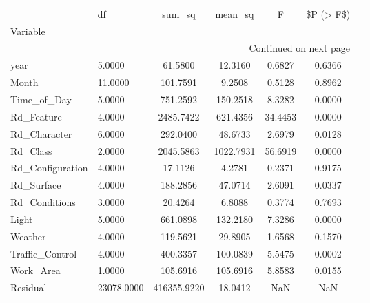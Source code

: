 \begin{longtable}{p{6cm}lccccc}
\toprule
{} &         df &      sum\_sq &   mean\_sq &       F &  \$P (> F\$) \\
Variable         &            &             &           &         &            \\
\midrule
\endhead
\midrule
\multicolumn{6}{r}{{Continued on next page}} \\
\midrule
\endfoot

\bottomrule
\endlastfoot
year             &     5.0000 &     61.5800 &   12.3160 &  0.6827 &     0.6366 \\
Month            &    11.0000 &    101.7591 &    9.2508 &  0.5128 &     0.8962 \\
Time\_of\_Day      &     5.0000 &    751.2592 &  150.2518 &  8.3282 &     0.0000 \\
Rd\_Feature       &     4.0000 &   2485.7422 &  621.4356 & 34.4453 &     0.0000 \\
Rd\_Character     &     6.0000 &    292.0400 &   48.6733 &  2.6979 &     0.0128 \\
Rd\_Class         &     2.0000 &   2045.5863 & 1022.7931 & 56.6919 &     0.0000 \\
Rd\_Configuration &     4.0000 &     17.1126 &    4.2781 &  0.2371 &     0.9175 \\
Rd\_Surface       &     4.0000 &    188.2856 &   47.0714 &  2.6091 &     0.0337 \\
Rd\_Conditions    &     3.0000 &     20.4264 &    6.8088 &  0.3774 &     0.7693 \\
Light            &     5.0000 &    661.0898 &  132.2180 &  7.3286 &     0.0000 \\
Weather          &     4.0000 &    119.5621 &   29.8905 &  1.6568 &     0.1570 \\
Traffic\_Control  &     4.0000 &    400.3357 &  100.0839 &  5.5475 &     0.0002 \\
Work\_Area        &     1.0000 &    105.6916 &  105.6916 &  5.8583 &     0.0155 \\
Residual         & 23078.0000 & 416355.9220 &   18.0412 &     NaN &        NaN \\
\end{longtable}
